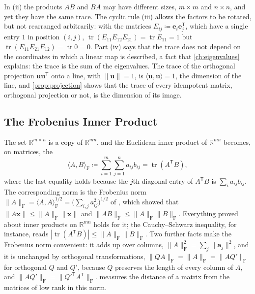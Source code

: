 In (ii) the products $AB$ and $BA$ may have different sizes, $m\times m$ and $n\times n$, and yet they have the same trace. The cyclic rule (iii) allows the factors to be rotated, but not rearranged arbitrarily: with the matrices $E_{ij}\coloneqq\mathbf e_i\mathbf e_j^{\mathsf T}$, which have a single entry $1$ in position $(i,j)$, $\operatorname{tr}(E_{11}E_{12}E_{21})=\operatorname{tr}E_{11}=1$ but $\operatorname{tr}(E_{11}E_{21}E_{12})=\operatorname{tr}0=0$. Part (iv) says that the trace does not depend on the coordinates in which a linear map is described, a fact that \cref{ch:eigenvalues} explains: the trace is the sum of the eigenvalues. The trace of the orthogonal projection $\mathbf u\mathbf u^{\mathsf T}$ onto a line, with $\|\mathbf u\|=1$, is $\langle\mathbf u,\mathbf u\rangle=1$, the dimension of the line, and \cref{prop:projection} shows that the trace of every idempotent matrix, orthogonal projection or not, is the dimension of its image.

\subsection{The Frobenius Inner Product}

The set $\mathbb R^{m\times n}$ is a copy of $\mathbb R^{mn}$, and the Euclidean inner product of $\mathbb R^{mn}$ becomes, on matrices, the 
\[
\langle A,B\rangle_{\mathrm F}\coloneqq\sum_{i=1}^m\sum_{j=1}^na_{ij}b_{ij}=\operatorname{tr}(A^{\mathsf T}B),
\]
where the last equality holds because the $j$th diagonal entry of $A^{\mathsf T}B$ is $\sum_ia_{ij}b_{ij}$. The corresponding norm is the Frobenius norm $\|A\|_{\mathrm F}=\langle A,A\rangle_{\mathrm F}^{1/2}=\bigl(\sum_{i,j}a_{ij}^2\bigr)^{1/2}$ of , which showed that $\|A\mathbf x\|\le\|A\|_{\mathrm F}\|\mathbf x\|$ and $\|AB\|_{\mathrm F}\le\|A\|_{\mathrm F}\|B\|_{\mathrm F}$. Everything proved about inner products on $\mathbb R^{mn}$ holds for it; the Cauchy--Schwarz inequality, for instance, reads $|\operatorname{tr}(A^{\mathsf T}B)|\le\|A\|_{\mathrm F}\|B\|_{\mathrm F}$. Two further facts make the Frobenius norm convenient: it adds up over columns, $\|A\|_{\mathrm F}^2=\sum_j\|\mathbf a_j\|^2$, and it is unchanged by orthogonal transformations, $\|QA\|_{\mathrm F}=\|A\|_{\mathrm F}=\|AQ'\|_{\mathrm F}$ for orthogonal $Q$ and $Q'$, because $Q$ preserves the length of every column of $A$, and $\|AQ'\|_{\mathrm F}=\|Q'^{\mathsf T}A^{\mathsf T}\|_{\mathrm F}$.  measures the distance of a matrix from the matrices of low rank in this norm.

